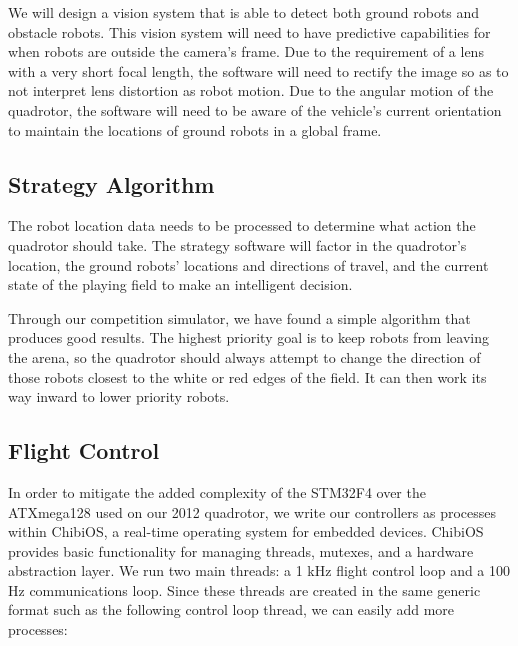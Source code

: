 \documentclass[12pt,letterpaper]{article} \usepackage[margin=1in]{geometry}
\begin{document}
We will design a vision system that is able to detect both ground robots and
obstacle robots. This vision system will need to have predictive capabilities
for when robots are outside the camera's frame. Due to the requirement of a lens
with a very short focal length, the software will need to rectify the image so
as to not interpret lens distortion as robot motion. Due to the angular motion
of the quadrotor, the software will need to be aware of the vehicle's current
orientation to maintain the locations of ground robots in a global frame.


\subsection*{Strategy Algorithm}

The robot location data needs to be processed to determine what action the
quadrotor should take. The strategy software will factor in the quadrotor's
location, the ground robots' locations and directions of travel, and the
current state of the playing field to make an intelligent decision.

Through our competition simulator, we have found a simple algorithm that
produces good results. The highest priority goal is to keep robots from leaving
the arena, so the quadrotor should always attempt to change the direction of
those robots closest to the white or red edges of the field. It can then work
its way inward to lower priority robots.


\subsection*{Flight Control}

In order to mitigate the added complexity of the STM32F4 over the ATXmega128
used on our 2012 quadrotor, we write our controllers as processes within
ChibiOS, a real-time operating system for embedded devices. ChibiOS provides
basic functionality for managing threads, mutexes, and a hardware abstraction
layer. We run two main threads: a 1 kHz flight control loop and a 100 Hz
communications loop. Since these threads are created in the same generic format
such as the following control loop thread, we can easily add more processes:
\end{document}
